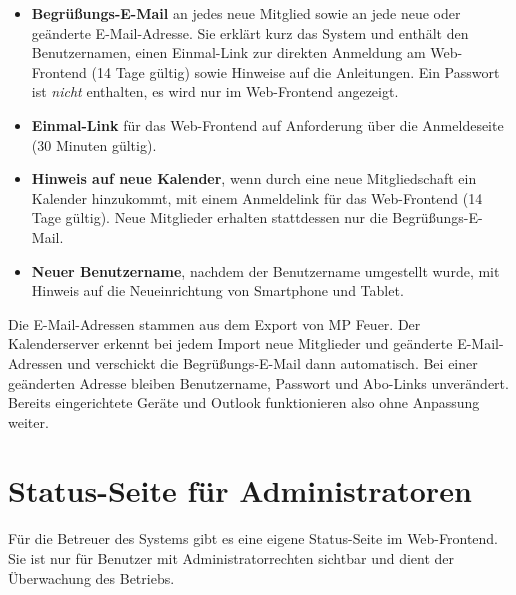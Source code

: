 \documentclass[a4paper,fontsize=10pt]{scrartcl}
\begin{document}
\begin{itemize}
  \item \textbf{Begrüßungs-E-Mail} an jedes neue Mitglied sowie an jede
        neue oder geänderte E-Mail-Adresse. Sie erklärt kurz das System und
        enthält den Benutzernamen, einen Einmal-Link zur direkten Anmeldung am
        Web-Frontend (14 Tage gültig) sowie Hinweise auf die Anleitungen. Ein
        Passwort ist \emph{nicht} enthalten, es wird nur im Web-Frontend
        angezeigt.
  \item \textbf{Einmal-Link} für das Web-Frontend auf Anforderung über die
        Anmeldeseite (30 Minuten gültig).
  \item \textbf{Hinweis auf neue Kalender}, wenn durch eine neue
        Mitgliedschaft ein Kalender hinzukommt, mit einem Anmeldelink für das
        Web-Frontend (14 Tage gültig). Neue Mitglieder erhalten stattdessen
        nur die Begrüßungs-E-Mail.
  \item \textbf{Neuer Benutzername}, nachdem der Benutzername umgestellt
        wurde, mit Hinweis auf die Neueinrichtung von Smartphone und Tablet.
\end{itemize}

Die E-Mail-Adressen stammen aus dem Export von MP Feuer. Der Kalenderserver
erkennt bei jedem Import neue Mitglieder und geänderte E-Mail-Adressen und
verschickt die Begrüßungs-E-Mail dann automatisch. Bei einer geänderten Adresse
bleiben Benutzername, Passwort und Abo-Links unverändert. Bereits
eingerichtete Geräte und Outlook funktionieren also ohne Anpassung weiter.

\section{Status-Seite für Administratoren}\label{sec:admin}

Für die Betreuer des Systems gibt es eine eigene Status-Seite im
Web-Frontend. Sie ist nur für Benutzer mit Administratorrechten sichtbar und
dient der Überwachung des Betriebs.
\end{document}
